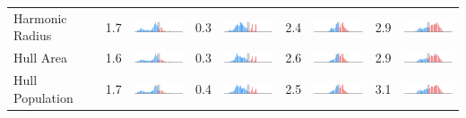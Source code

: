 \begin{table}
\begin{tabular}{lcccccccc}
Harmonic Radius        &     1.7 &  \includegraphics[width=7em]{comp_hist/il_harm_radius} &     0.3 &  \includegraphics[width=7em]{comp_hist/md_harm_radius} &     2.4 &  \includegraphics[width=7em]{comp_hist/nc_harm_radius} &     2.9 &  \includegraphics[width=7em]{comp_hist/tx_harm_radius} \\
Hull Area              &     1.6 &       \includegraphics[width=7em]{comp_hist/il_hull_a} &     0.3 &       \includegraphics[width=7em]{comp_hist/md_hull_a} &     2.6 &       \includegraphics[width=7em]{comp_hist/nc_hull_a} &     2.9 &       \includegraphics[width=7em]{comp_hist/tx_hull_a} \\
Hull Population        &     1.7 &       \includegraphics[width=7em]{comp_hist/il_hull_p} &     0.4 &       \includegraphics[width=7em]{comp_hist/md_hull_p} &     2.5 &       \includegraphics[width=7em]{comp_hist/nc_hull_p} &     3.1 &       \includegraphics[width=7em]{comp_hist/tx_hull_p} \\

\end{tabular}
\end{table}
